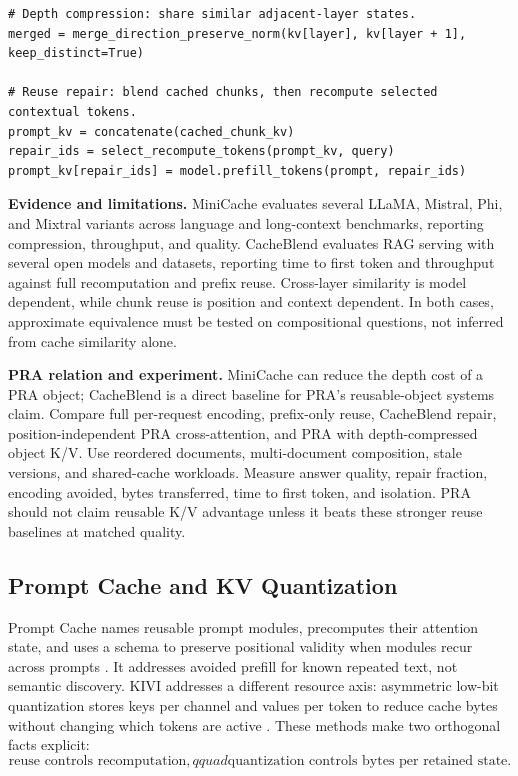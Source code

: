 \begin{lstlisting}[caption={Two orthogonal cache transformations}]
# Depth compression: share similar adjacent-layer states.
merged = merge_direction_preserve_norm(kv[layer], kv[layer + 1], keep_distinct=True)

# Reuse repair: blend cached chunks, then recompute selected contextual tokens.
prompt_kv = concatenate(cached_chunk_kv)
repair_ids = select_recompute_tokens(prompt_kv, query)
prompt_kv[repair_ids] = model.prefill_tokens(prompt, repair_ids)
\end{lstlisting}

\textbf{Evidence and limitations.} MiniCache evaluates several LLaMA, Mistral, Phi, and
Mixtral variants across language and long-context benchmarks, reporting compression,
throughput, and quality. CacheBlend evaluates RAG serving with several open models and
datasets, reporting time to first token and throughput against full recomputation and
prefix reuse. Cross-layer similarity is model dependent, while chunk reuse is position and
context dependent. In both cases, approximate equivalence must be tested on compositional
questions, not inferred from cache similarity alone.

\textbf{PRA relation and experiment.} MiniCache can reduce the depth cost of a PRA object;
CacheBlend is a direct baseline for PRA's reusable-object systems claim. Compare full
per-request encoding, prefix-only reuse, CacheBlend repair, position-independent PRA
cross-attention, and PRA with depth-compressed object K/V. Use reordered documents,
multi-document composition, stale versions, and shared-cache workloads. Measure answer
quality, repair fraction, encoding avoided, bytes transferred, time to first token, and
isolation. PRA should not claim reusable K/V advantage unless it beats these stronger
reuse baselines at matched quality.

\subsection{Prompt Cache and KV Quantization}

Prompt Cache names reusable prompt modules, precomputes their attention state, and uses a
schema to preserve positional validity when modules recur across prompts
\citep{gim2024promptcache}. It addresses avoided prefill for known repeated text, not semantic
discovery. KIVI addresses a different resource axis: asymmetric low-bit quantization stores
keys per channel and values per token to reduce cache bytes without changing which tokens are
active \citep{liu2024kivi}. These methods make two orthogonal facts explicit:
\begin{equation}
\text{reuse controls recomputation},qquad
\text{quantization controls bytes per retained state}.
\end{equation}

